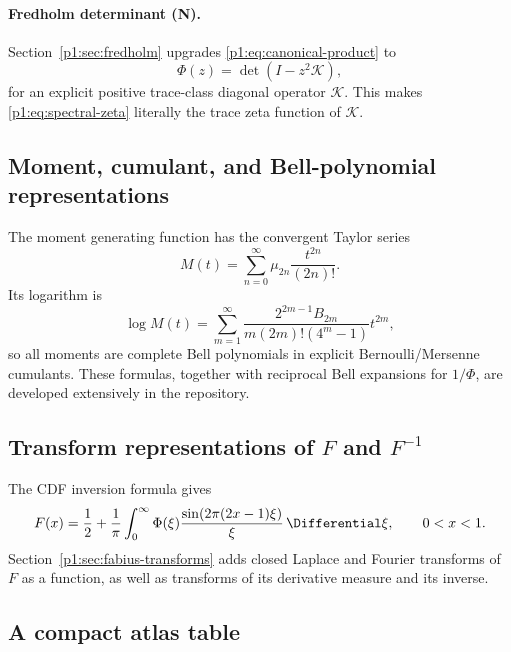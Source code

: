 \documentclass[11pt]{article}
\theoremstyle{definition}
\theoremstyle{remark}
\newcommand{\cK}{\mathcal K}
\newcommand{\statusnew}{\textsf{N}}
\begin{document}
\paragraph{Fredholm determinant (\statusnew).}
Section~\ref{p1:sec:fredholm} upgrades \eqref{p1:eq:canonical-product} to
\begin{equation}
 \Phi(z)=\det(I-z^2\cK),                                    \label{p1:eq:fredholm-preview}
\end{equation}
for an explicit positive trace-class diagonal operator \(\cK\).  This makes
\eqref{p1:eq:spectral-zeta} literally the trace zeta function of \(\cK\).

\subsection{Moment, cumulant, and Bell-polynomial representations}

The moment generating function has the convergent Taylor series
\begin{equation}
 M(t)=\sum_{n=0}^{\infty}\mu_{2n}\frac{t^{2n}}{(2n)!}.       \label{p1:eq:M-moment-series}
\end{equation}
Its logarithm is
\begin{equation}
 \log M(t)=
 \sum_{m=1}^{\infty}
 \frac{2^{2m-1}B_{2m}}{m(2m)!(4^m-1)}t^{2m},                \label{p1:eq:M-cumulant}
\end{equation}
so all moments are complete Bell polynomials in explicit Bernoulli/Mersenne cumulants.
These formulas, together with reciprocal Bell expansions for \(1/\Phi\), are developed
extensively in the repository.

\subsection[Transform representations of F and inverse F]{Transform representations of \(F\) and \(F^{-1}\)}

The CDF inversion formula gives
\begin{equation}
 F(x)=\frac12+\frac1\pi\int_0^{\infty}
 \Phi(\xi)\frac{\sin(2\pi(2x-1)\xi)}{\xi}\,\Differential\xi,
 \qquad 0<x<1.                                               \label{p1:eq:F-CDF-Fourier}
\end{equation}
Section~\ref{p1:sec:fabius-transforms} adds closed Laplace and Fourier transforms of \(F\) as
a function, as well as transforms of its derivative measure and its inverse.

\subsection{A compact atlas table}
\end{document}
